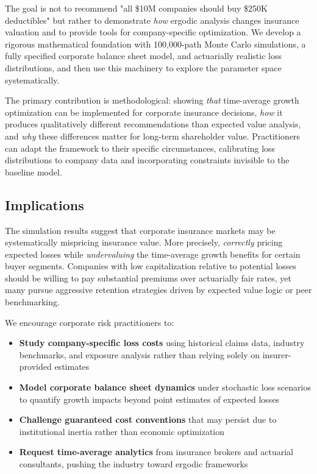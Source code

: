 \documentclass[11pt,letterpaper]{article}
\begin{document}
The goal is not to recommend "all \$10M companies should buy \$250K deductibles" but rather to demonstrate \emph{how} ergodic analysis changes insurance valuation and to provide tools for company-specific optimization. We develop a rigorous mathematical foundation with 100,000-path Monte Carlo simulations, a fully specified corporate balance sheet model, and actuarially realistic loss distributions, and then use this machinery to explore the parameter space systematically.

The primary contribution is methodological: showing \emph{that} time-average growth optimization can be implemented for corporate insurance decisions, \emph{how} it produces qualitatively different recommendations than expected value analysis, and \emph{why} these differences matter for long-term shareholder value. Practitioners can adapt the framework to their specific circumstances, calibrating loss distributions to company data and incorporating constraints invisible to the baseline model.

\subsection{Implications}

The simulation results suggest that corporate insurance markets may be systematically mispricing insurance value. More precisely, \emph{correctly} pricing expected losses while \emph{undervaluing} the time-average growth benefits for certain buyer segments. Companies with low capitalization relative to potential losses should be willing to pay substantial premiums over actuarially fair rates, yet many pursue aggressive retention strategies driven by expected value logic or peer benchmarking.

We encourage corporate risk practitioners to:
\begin{itemize}
    \item \textbf{Study company-specific loss costs} using historical claims data, industry benchmarks, and exposure analysis rather than relying solely on insurer-provided estimates
    \item \textbf{Model corporate balance sheet dynamics} under stochastic loss scenarios to quantify growth impacts beyond point estimates of expected losses
    \item \textbf{Challenge guaranteed cost conventions} that may persist due to institutional inertia rather than economic optimization
    \item \textbf{Request time-average analytics} from insurance brokers and actuarial consultants, pushing the industry toward ergodic frameworks
\end{itemize}
\end{document}
